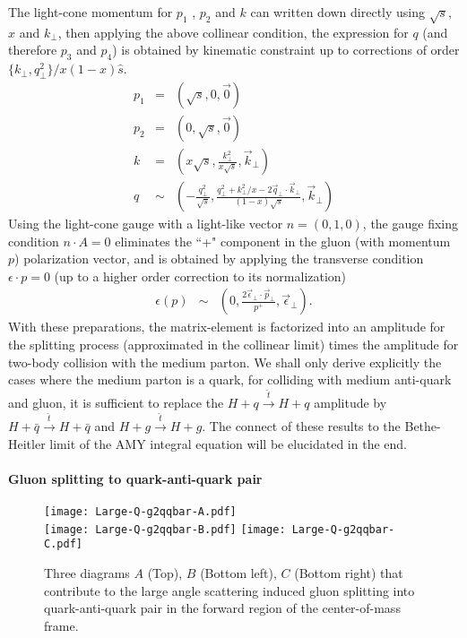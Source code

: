 The light-cone momentum for $p_1$ , $p_2$ and $k$ can written down directly using $\sqrt{s}$, $x$ and $k_\perp$, then applying the above collinear condition, the expression for $q$ (and therefore $p_3$ and $p_4$) is obtained by kinematic constraint up to corrections of order $\{k_\perp, q_\perp^2\}/x(1-x)\hat{s}$.
\begin{eqnarray}
p_1 &=& (\sqrt{s}, 0, \vec{0})\\
p_2 &=& (0, \sqrt{s}, \vec{0})\\
k &=& (x\sqrt{s}, \frac{k_\perp^2}{x\sqrt{s}}, \vec{k}_\perp)\\
q &\sim& (-\frac{q_\perp^2}{\sqrt{s}}, \frac{q_\perp^2 + k_\perp^2/x - 
2\vec{q}_\perp \cdot \vec{k}_\perp}{(1-x)\sqrt{s}}, \vec{k}_\perp)
\end{eqnarray}
Using the light-cone gauge with a light-like vector $n = (0, 1, 0)$, the gauge fixing condition $n\cdot A =0$ eliminates the ``+" component in the gluon (with momentum $p$) polarization vector, and is obtained by applying the transverse condition $\epsilon \cdot p = 0$ (up to a higher order correction to its normalization)
\begin{eqnarray}
\epsilon(p) &\sim& (0, \frac{2\vec{\epsilon}_\perp\cdot\vec{p}_\perp}{p^+}, \vec{\epsilon}_\perp).
\end{eqnarray}
With these preparations, the matrix-element is factorized into an amplitude for the splitting process (approximated in the collinear limit) times the amplitude for two-body collision with the medium parton.
We shall only derive explicitly the cases where the medium parton is a quark, for colliding with medium anti-quark and gluon, it is sufficient to replace the $H+q\xrightarrow{\hat{t}} H+q$ amplitude by $H+\bar{q}\xrightarrow{\hat{t}} H+\bar{q}$ and $H+g\xrightarrow{\hat{t}} H+g$.
The connect of these results to the Bethe-Heitler limit of the AMY integral equation will be elucidated in the end.

\paragraph*{Gluon splitting to quark-anti-quark pair}
\begin{figure}
\centering
\texttt{[image: Large-Q-g2qqbar-A.pdf]}\\
\vspace{1em}
\texttt{[image: Large-Q-g2qqbar-B.pdf]}\hfill
\texttt{[image: Large-Q-g2qqbar-C.pdf]}
\caption{Three diagrams $A$ (Top), $B$ (Bottom left), $C$ (Bottom right) that contribute to the large angle scattering induced gluon splitting into quark-anti-quark pair in the forward region of the center-of-mass frame.}
\label{fig:feyn-g2qqbar}
\end{figure}

